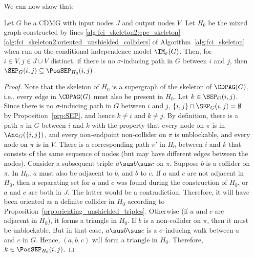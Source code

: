 We can now show that:
\begin{Lem}\label{lem:possep}
  Let $G$ be a CDMG with input nodes $J$ and output nodes $V$.
  Let $H_0$ be the mixed graph constructed by lines 
  \ref{alg:fci_skeleton2:cpc_skeleton}--\ref{alg:fci_skeleton2:oriented_unshielded_colliders}
  of Algorithm~\ref{alg:fci_skeleton} when run on the conditional independence model $\IM_\sigma(G)$.
  Then, for $i \in V, j \in J \cup V$ distinct, if there is no $\sigma$-inducing path in $G$ between $i$ and $j$, then
  $\SEP_G(i,j) \subseteq \PosSEP_{H_0}(i,j)$.
\end{Lem}
\begin{proof}
  Note that the skeleton of $H_0$ is a supergraph of the skeleton of $\CDPAG(G)$, i.e., every edge in $\CDPAG(G)$ must also be present in $H_0$.
  Let $k \in \SEP_G(i,j)$.
  Since there is no $\sigma$-inducing path in $G$ between $i$ and $j$, $\{i,j\} \cap \SEP_G(i,j) = \emptyset$ by Proposition~\ref{prp:SEP}, and hence $k \ne i$ and $k \ne j$.
  By definition, there is a path $\pi$ in $G$ between $i$ and $k$ with the property that every node on $\pi$ is in $\Anc_G(\{i,j\})$, and every non-endpoint non-collider on $\pi$ is unblockable, and every node on $\pi$ is in $V$.
  There is a corresponding path $\pi'$ in $H_0$ between $i$ and $k$ that consists of the same sequence of nodes (but may have different edges between the nodes).
  Consider a subsequent triple $a \sus b \sus c$ on $\pi$.
  Suppose $b$ is a collider on $\pi$.
  In $H_0$, $a$ must also be adjacent to $b$, and $b$ to $c$.
  If $a$ and $c$ are not adjacent in $H_0$, then a separating set for $a$ and $c$ was found during the construction of $H_0$, or $a$ and $c$ are both in $J$.
  The latter would be a contradiction. 
  Therefore, it will have been oriented as a definite collider in $H_0$ according to Proposition~\ref{prp:orienting_unshielded_triples}.
  Otherwise (if $a$ and $c$ are adjacent in $H_0$), it forms a triangle in $H_0$.
  If $b$ is a non-collider on $\pi$, then it must be unblockable.
  But in that case, $a \sus b \sus c$ is a $\sigma$-inducing walk between $a$ and $c$ in $G$.
  Hence, $(a,b,c)$ will form a triangle in $H_0$.
  Therefore, $k \in \PosSEP_{H_0}(i,j)$.
\end{proof}

